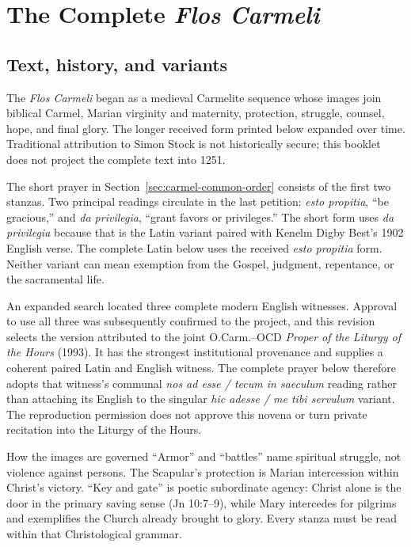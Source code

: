 \clearpage
\section{The Complete \textit{Flos Carmeli}}
\label{sec:carmel-received-prayers}

\subsection{Text, history, and variants}

The \textit{Flos Carmeli} began as a medieval Carmelite sequence whose images join biblical Carmel, Marian virginity and maternity, protection, struggle, counsel, hope, and final glory. The longer received form printed below expanded over time. Traditional attribution to Simon Stock is not historically secure; this booklet does not project the complete text into 1251.

The short prayer in Section~\ref{sec:carmel-common-order} consists of the first two stanzas. Two principal readings circulate in the last petition: \textit{esto propitia}, ``be gracious,'' and \textit{da privilegia}, ``grant favors or privileges.'' The short form uses \textit{da privilegia} because that is the Latin variant paired with Kenelm Digby Best's 1902 English verse. The complete Latin below uses the received \textit{esto propitia} form. Neither variant can mean exemption from the Gospel, judgment, repentance, or the sacramental life.

An expanded search located three complete modern English witnesses. Approval to use all three was subsequently confirmed to the project, and this revision selects the version attributed to the joint O.Carm.--OCD \textit{Proper of the Liturgy of the Hours} (1993). It has the strongest institutional provenance and supplies a coherent paired Latin and English witness. The complete prayer below therefore adopts that witness's communal \textit{nos ad esse / tecum in saeculum} reading rather than attaching its English to the singular \textit{hic adesse / me tibi servulum} variant. The reproduction permission does not approve this novena or turn private recitation into the Liturgy of the Hours.

\begin{studybox}{How the images are governed}
``Armor'' and ``battles'' name spiritual struggle, not violence against persons. The Scapular's protection is Marian intercession within Christ's victory. ``Key and gate'' is poetic subordinate agency: Christ alone is the door in the primary saving sense (Jn 10:7--9), while Mary intercedes for pilgrims and exemplifies the Church already brought to glory. Every stanza must be read within that Christological grammar.
\end{studybox}

